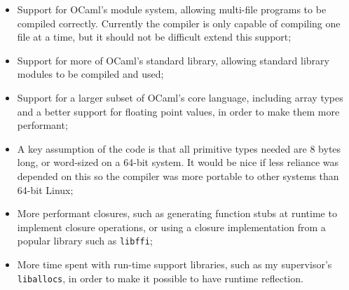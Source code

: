 \begin{itemize}

    \item Support for OCaml's module system, allowing multi-file programs to be
        compiled correctly. Currently the compiler is only capable of compiling
        one file at a time, but it should not be difficult extend this support;

    \item Support for more of OCaml's standard library, allowing standard
        library modules to be compiled and used;

    \item Support for a larger subset of OCaml's core language, including array
        types and a better support for floating point values, in order to make
        them more performant;

    \item A key assumption of the code is that all primitive types needed are 8
        bytes long, or word-sized on a 64-bit system. It would be nice if less
        reliance was depended on this so the compiler was more portable to other
        systems than 64-bit Linux;

    \item More performant closures, such as generating function stubs at runtime
        to implement closure operations, or using a closure implementation from
        a popular library such as \texttt{libffi};

    \item More time spent with run-time support libraries, such as my
        supervisor's \texttt{liballocs}, in order to make it possible to have
        runtime reflection.

\end{itemize}
